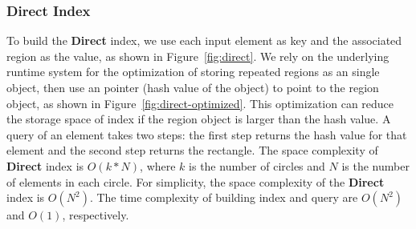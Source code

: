 \documentclass{sig-alternate}
\begin{document}
\subsubsection{Direct Index}
To build the {\bf Direct} index, we use each input element as key and the associated region as the value, as shown in Figure~\ref{fig:direct}.
We rely on the underlying runtime system for the optimization of storing repeated regions as an single object,
then use an pointer (hash value of the object) to point to the region object, as shown in Figure~\ref{fig:direct-optimized}.
This optimization can reduce the storage space of index if the region object is larger than the hash value. 
A query of an element takes two steps: the first step returns the hash value for that element and the second step returns the rectangle. 
The space complexity of {\bf Direct} index is $O(k*N)$, where $k$ is the number of circles and $N$ is the number of elements in each circle.
For simplicity, the space complexity of the {\bf Direct} index is $O(N^2)$.
The time complexity of building index and query are $O(N^2)$ and $O(1)$, respectively.
\end{document}
